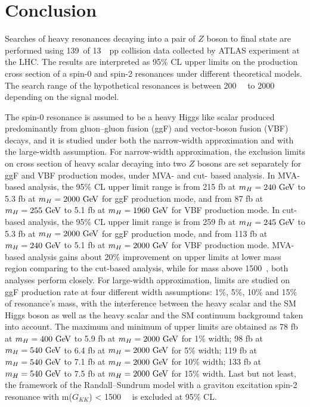 \section{Conclusion}

Searches of heavy resonances decaying into a pair of $Z$ boson to \llll final state are performed using
139~\ifb of 13~\tev~pp collision data collected by ATLAS experiment at the LHC.
The results are interpreted as 95\% CL upper limits on the production cross section of a spin-0 and spin-2 resonances under different theoretical models.
The search range of the hypothetical resonances is between 200~\gev~ to 2000~\gev~ depending on the signal model.

The spin-0 resonance is assumed to be a heavy Higgs like scalar produced predominantly from gluon–gluon fusion (ggF) and vector-boson fusion (VBF) decays, 
and it is studied under both the narrow-width approximation and with the large-width assumption.
For narrow-width approximation, the exclusion limits on cross section of heavy scalar decaying into two $Z$ bosons are set separately for ggF and VBF production modes, under MVA- and cut- based analysis.
In MVA-based analysis, the 95\% CL upper limit range is from 215 fb at $m_{H} = 240~\text{Ge\kern -0.1em V}$ to 5.3 fb at $m_{H} = 2000~\text{Ge\kern -0.1em V}$ for ggF production mode, 
and from 87 fb at $m_{H} = 255~\text{Ge\kern -0.1em V}$ to 5.1 fb at $m_{H} = 1960~\text{Ge\kern -0.1em V}$ for VBF production mode.
In cut-based analysis, the 95\% CL upper limit range is from 259 fb at $m_{H} = 245~\text{Ge\kern -0.1em V}$ to 5.3 fb at $m_{H} = 2000~\text{Ge\kern -0.1em V}$ for ggF production mode, 
and from 113 fb at $m_{H} = 240~\text{Ge\kern -0.1em V}$ to 5.1 fb at $m_{H} = 2000~\text{Ge\kern -0.1em V}$ for VBF production mode.
MVA-based analysis gains about 20\% improvement on upper limits at lower mass region comparing to the cut-based analysis, while for mass above 1500~\gev, both analyses perform closely.
For large-width approximation, limits are studied on ggF production rate at four different width assumptions: 1\%, 5\%, 10\% and 15\% of resonance's mass,
 with the interference between the heavy scalar and the SM Higgs boson as well as the heavy scalar and the SM \ggZZ continuum background taken into account.
The maximum and minimum of upper limits are obtained as 78 fb at $m_{H} = 400~\text{Ge\kern -0.1em V}$ to 5.9 fb at $m_{H} = 2000~\text{Ge\kern -0.1em V}$ for 1\% width;
98 fb at $m_{H} = 540~\text{Ge\kern -0.1em V}$ to 6.4 fb at $m_{H} = 2000~\text{Ge\kern -0.1em V}$ for 5\% width;
119 fb at $m_{H} = 540~\text{Ge\kern -0.1em V}$ to 7.1 fb at $m_{H} = 2000~\text{Ge\kern -0.1em V}$ for 10\% width;
133 fb at $m_{H} = 540~\text{Ge\kern -0.1em V}$ to 7.5 fb at $m_{H} = 2000~\text{Ge\kern -0.1em V}$ for 15\% width.
Last but not least, the framework of the Randall–Sundrum model with a graviton excitation spin-2 resonance with m($G_{KK}$) < 1500~\gev~ is excluded at 95\% CL.
